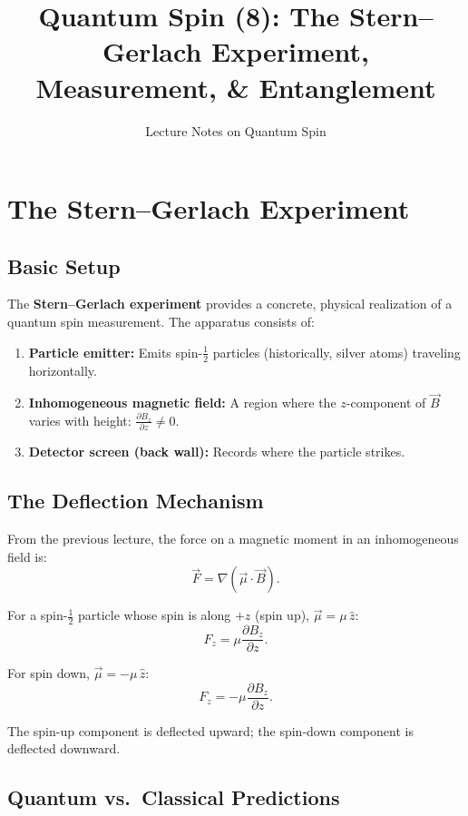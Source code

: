 \documentclass[11pt,a4paper]{article}
\title{\textbf{Quantum Spin (8): The Stern--Gerlach Experiment, \\ Measurement, \& Entanglement}}
\author{Lecture Notes on Quantum Spin}
\date{}
\theoremstyle{definition}
\theoremstyle{plain}
\theoremstyle{remark}
\begin{document}
\maketitle
\tableofcontents
\newpage

\section{The Stern--Gerlach Experiment}

\subsection{Basic Setup}

The \textbf{Stern--Gerlach experiment} provides a concrete, physical realization of a quantum spin measurement. The apparatus consists of:

\begin{enumerate}
    \item \textbf{Particle emitter:} Emits spin-$\frac{1}{2}$ particles (historically, silver atoms) traveling horizontally.
    \item \textbf{Inhomogeneous magnetic field:} A region where the $z$-component of $\vec{B}$ varies with height: $\frac{\partial B_z}{\partial z} \neq 0$.
    \item \textbf{Detector screen (back wall):} Records where the particle strikes.
\end{enumerate}

\subsection{The Deflection Mechanism}

From the previous lecture, the force on a magnetic moment in an inhomogeneous field is:
\[
    \vec{F} = \nabla(\vec{\mu}\cdot\vec{B}).
\]

For a spin-$\frac{1}{2}$ particle whose spin is along $+z$ (spin up), $\vec{\mu} = \mu\,\hat{z}$:
\[
    F_z = \mu\frac{\partial B_z}{\partial z}.
\]

For spin down, $\vec{\mu} = -\mu\,\hat{z}$:
\[
    F_z = -\mu\frac{\partial B_z}{\partial z}.
\]

The spin-up component is deflected upward; the spin-down component is deflected downward.

\subsection{Quantum vs.\ Classical Predictions}
\end{document}
